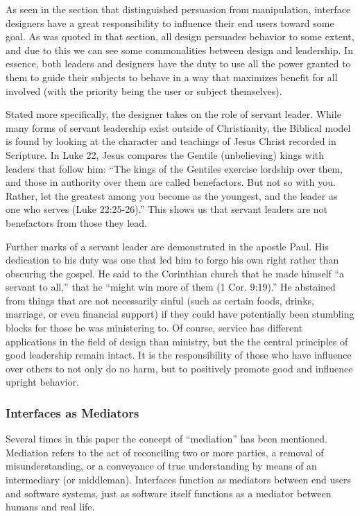 \documentclass[12pt, oneside]{article}
\begin{document}
As seen in the section that distinguished persuasion from manipulation, interface designers have a great responsibility to influence their end users toward some goal. As was quoted in that section, all design persuades behavior to some extent, and due to this we can see some commonalities between design and leadership. In essence, both leaders and designers have the duty to use all the power granted to them to guide their subjects to behave in a way that maximizes benefit for all involved (with the priority being the user or subject themselves).

Stated more specifically, the designer takes on the role of servant leader. While many forms of servant leadership exist outside of Christianity, the Biblical model is found by looking at the character and teachings of Jesus Christ recorded in Scripture. In Luke 22, Jesus compares the Gentile (unbelieving) kings with leaders that follow him: ``The kings of the Gentiles exercise lordship over them, and those in authority over them are called benefactors. But not so with you. Rather, let the greatest among you become as the youngest, and the leader as one who serves (Luke 22:25-26).'' This shows us that servant leaders are not benefactors from those they lead.

Further marks of a servant leader are demonstrated in the apostle Paul. His dedication to his duty was one that led him to forgo his own right rather than obscuring the gospel. He said to the Corinthian church that he made himself ``a servant to all,'' that he ``might win more of them (1 Cor. 9:19).'' He abstained from things that are not necessarily sinful (such as certain foods, drinks, marriage, or even financial support) if they could have potentially been stumbling blocks for those he was ministering to. Of course, service has different applications in the field of design than ministry, but the the central principles of good leadership remain intact. It is the responsibility of those who have influence over others to not only do no harm, but to positively promote good and influence upright behavior.

\subsubsection{Interfaces as Mediators}

Several times in this paper the concept of ``mediation'' has been mentioned. Mediation refers to the act of reconciling two or more parties, a removal of misunderstanding, or a conveyance of true understanding by means of an intermediary (or middleman). Interfaces function as mediators between end users and software systems, just as software itself functions as a mediator between humans and real life.
\end{document}
